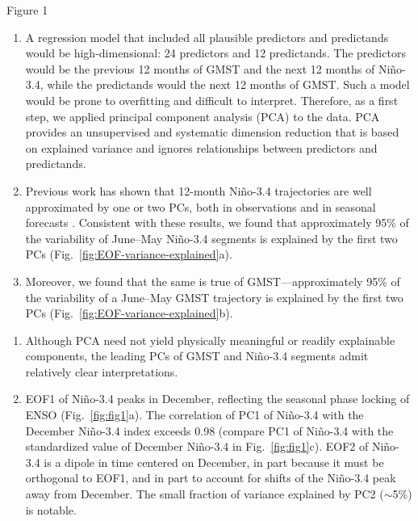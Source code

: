 \documentclass[aspectratio=169,xcolor=dvipsnames]{beamer}
\begin{document}
\begin{frame}{Figure 1}
  \begin{enumerate}\fontsize{6pt}{8pt}\selectfont

  \item A regression model that included all plausible predictors and
    predictands would be high-dimensional: 24 predictors and 12
    predictands. The predictors would be the previous 12 months of
    GMST and the next 12 months of Ni\~no-3.4, while the predictands
    would the next 12 months of GMST. Such a model would be prone to
    overfitting and difficult to interpret. Therefore, as a first
    step, we applied principal component analysis (PCA) to the
    data. PCA provides an unsupervised and systematic dimension
    reduction that is based on explained variance and ignores
    relationships between predictors and predictands.

  \item Previous work has shown that 12-month Ni\~no-3.4 trajectories
    are well approximated by one or two PCs, both in observations and
    in seasonal forecasts \citep{Bunge2009verified,Tippett2019:ENSO}.
    Consistent with these results, we found that approximately 95\% of
    the variability of June--May Ni\~no-3.4 segments is explained by the
    first two PCs (Fig.\ \ref{fig:EOF-variance-explained}a).
    
  \item Moreover, we found that the same is true of
    GMST---approximately 95\% of the variability of a June--May GMST
    trajectory is explained by the first two PCs (Fig.\
    \ref{fig:EOF-variance-explained}b).
  \end{enumerate}
  \begin{enumerate}\fontsize{6pt}{8pt}\selectfont

  \item Although PCA need not yield physically meaningful or readily
    explainable components, the leading PCs of GMST and Niño-3.4
    segments admit relatively clear interpretations.
    
  \item EOF1 of Ni\~no-3.4 peaks in December, reflecting the seasonal
    phase locking of ENSO (Fig.\ \ref{fig:fig1}a).  The correlation of
    PC1 of Ni\~no-3.4 with the December Ni\~no-3.4 index exceeds 0.98
    (compare PC1 of Ni\~no-3.4 with the standardized value of December
    Ni\~no-3.4 in Fig.\ \ref{fig:fig1}c).  EOF2 of Ni\~no-3.4 is a
    dipole in time centered on December, in part because it must be
    orthogonal to EOF1, and in part to account for shifts of the
    Ni\~no-3.4 peak away from December. The small fraction of variance
    explained by PC2 ($\sim$5\%) is notable.
    

\end{enumerate}
\end{frame}
\end{document}
